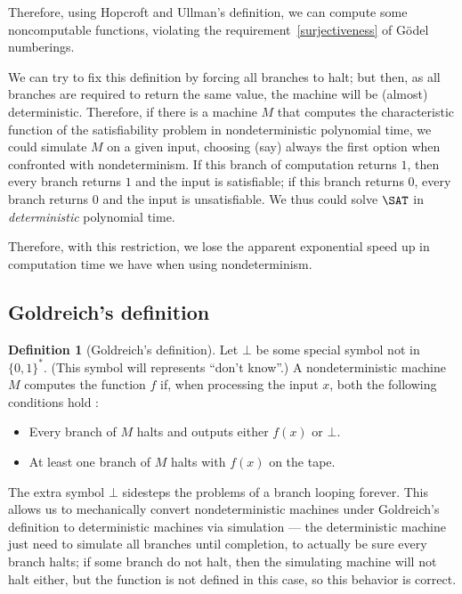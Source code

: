 \documentclass[12pt]{article}
\theoremstyle{definition}
\newtheorem{definition}{Definition}
\begin{document}
Therefore,
using Hopcroft and Ullman's definition,
we can compute some noncomputable functions,
violating the requirement~\ref{surjectiveness} of Gödel numberings.

We can try to fix this definition by forcing all branches to halt;
but then, as all branches are required to return the same value,
the machine will be (almost) deterministic.
Therefore, if there is a machine $M$ that computes the characteristic function
of the satisfiability problem in nondeterministic polynomial time,
we could simulate $M$ on a given input,
choosing (say) always the first option when confronted with nondeterminism.
If this branch of computation returns $1$,
then every branch returns $1$ and the input is satisfiable;
if this branch returns $0$, every branch returns $0$ and the input is unsatisfiable.
We thus could solve $\SAT$ in \emph{deterministic} polynomial time.

Therefore, with this restriction,
we lose the apparent exponential speed up in computation time
we have when using nondeterminism.

\subsection{Goldreich's definition}
\label{sec:goldreich}

\begin{definition}[Goldreich's definition]
    Let $\bot$ be some special symbol not in $\{0, 1\}^*$.
    (This symbol will represents ``don't know''.)
    A nondeterministic machine $M$ computes the function $f$ if,
    when processing the input $x$,
    both the following conditions hold \cite[p.~168]{Goldreich2008}:
    \begin{itemize}
        \item Every branch of $M$ halts
            and outputs either $f(x)$ or $\bot$.
        \item At least one branch of $M$ halts with $f(x)$ on the tape.
    \end{itemize}
\end{definition}
The extra symbol $\bot$ sidesteps the problems of a branch looping forever.
This allows us to mechanically convert nondeterministic machines
under Goldreich's definition
to deterministic machines via simulation
--- the deterministic machine just need to simulate all branches until completion,
to actually be sure every branch halts;
if some branch do not halt,
then the simulating machine will not halt either,
but the function is not defined in this case,
so this behavior is correct.
\end{document}
